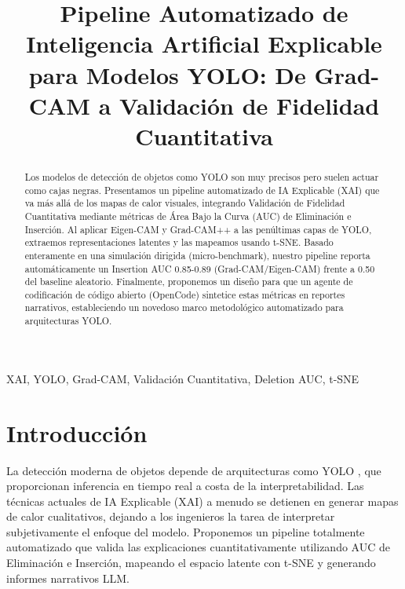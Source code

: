 \documentclass[conference]{IEEEtran}
\begin{document}
\title{Pipeline Automatizado de Inteligencia Artificial Explicable para Modelos YOLO: De Grad-CAM a Validación de Fidelidad Cuantitativa}

\author{
}
\maketitle

\begin{abstract}
Los modelos de detección de objetos como YOLO son muy precisos pero suelen actuar como cajas negras. Presentamos un pipeline automatizado de IA Explicable (XAI) que va más allá de los mapas de calor visuales, integrando Validación de Fidelidad Cuantitativa mediante métricas de Área Bajo la Curva (AUC) de Eliminación e Inserción. Al aplicar Eigen-CAM y Grad-CAM++ a las penúltimas capas de YOLO, extraemos representaciones latentes y las mapeamos usando t-SNE. Basado enteramente en una simulación dirigida (micro-benchmark), nuestro pipeline reporta automáticamente un Insertion AUC 0.85-0.89 (Grad-CAM/Eigen-CAM) frente a 0.50 del baseline aleatorio. Finalmente, proponemos un diseño para que un agente de codificación de código abierto (OpenCode) sintetice estas métricas en reportes narrativos, estableciendo un novedoso marco metodológico automatizado para arquitecturas YOLO.
\end{abstract}

\begin{IEEEkeywords}
XAI, YOLO, Grad-CAM, Validación Cuantitativa, Deletion AUC, t-SNE
\end{IEEEkeywords}

\section{Introducción}
La detección moderna de objetos depende de arquitecturas como YOLO \cite{redmon2016you, jocher2023yolov8}, que proporcionan inferencia en tiempo real a costa de la interpretabilidad. Las técnicas actuales de IA Explicable (XAI) a menudo se detienen en generar mapas de calor cualitativos, dejando a los ingenieros la tarea de interpretar subjetivamente el enfoque del modelo. Proponemos un pipeline totalmente automatizado que valida las explicaciones cuantitativamente utilizando AUC de Eliminación e Inserción, mapeando el espacio latente con t-SNE y generando informes narrativos LLM.
\end{document}
